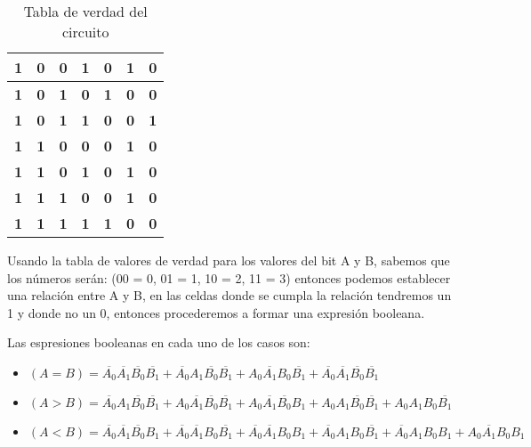 \documentclass[12pt, letterpaper]{article}
\begin{document}
\begin{table}[htbp]
\begin{tabular}{|c|c|c|c|c|c|c|}
                      \textbf{1} & \textbf{0} & \textbf{0} & \textbf{1} & \textbf{0} & \textbf{1} & \textbf{0} \\ \hline
                      \textbf{1} & \textbf{0} & \textbf{1} & \textbf{0} & \textbf{1} & \textbf{0} & \textbf{0} \\ \hline
                      \textbf{1} & \textbf{0} & \textbf{1} & \textbf{1} & \textbf{0} & \textbf{0} & \textbf{1} \\ \hline
                      \textbf{1} & \textbf{1} & \textbf{0} & \textbf{0} & \textbf{0} & \textbf{1} & \textbf{0} \\ \hline
                      \textbf{1} & \textbf{1} & \textbf{0} & \textbf{1} & \textbf{0} & \textbf{1} & \textbf{0} \\ \hline
                      \textbf{1} & \textbf{1} & \textbf{1} & \textbf{0} & \textbf{0} & \textbf{1} & \textbf{0} \\ \hline
                      \textbf{1} & \textbf{1} & \textbf{1} & \textbf{1} & \textbf{1} & \textbf{0} & \textbf{0} \\ \hline
                    \end{tabular}
                    \caption{Tabla de verdad del circuito}
                  \end{table}\vspace{.1cm}

                Usando la tabla de valores de verdad para los valores del bit A y B, sabemos
                que los números serán: (00 = 0, 01 = 1, 10 = 2, 11 = 3) entonces podemos
                establecer una relación entre A y B, en las celdas donde se cumpla la relación
                tendremos un 1 y donde no un 0, entonces procederemos a formar una expresión
                booleana.

                Las espresiones booleanas en cada uno de los casos son:
                \begin{itemize}
                  \item $(A=B)=\overline{A_0}\overline{A_1}\overline{B_0}\overline{B_1}+
                          \overline{A_0}A_1\overline{B_0}\overline{B_1}+A_0\overline{A_1}B_0\overline{B_1}
                          +\overline{A_0}\overline{A_1}\overline{B_0}\overline{B_1}$
                  \item $(A>B)=\overline{A_0}A_1\overline{B_0}\overline{B_1}+A_0\overline{A_1}\overline{B_0}\overline{B_1}
                          +A_0\overline{A_1}\overline{B_0}B_1+A_0A_1\overline{B_0}\overline{B_1}+
                          A_0A_1B_0\overline{B_1}$
                  \item $(A<B)=\overline{A_0}\overline{A_1}\overline{B_0}B_1+\overline{A_0}\overline{A_1}B_0\overline{B_1}
                          +\overline{A_0}\overline{A_1}B_0B_1+\overline{A_0}A_1B_0\overline{B_1}+
                          \overline{A_0}A_1B_0B_1+A_0\overline{A_1}B_0B_1$ 
                \end{itemize}
\end{document}
